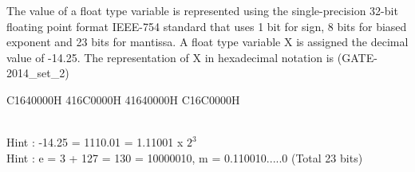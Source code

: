 \begin{questyle}
  \question  The value of a float type variable is represented using the single-precision 32-bit
             floating point format IEEE-754 standard that uses 1 bit for sign, 8 bits for biased
             exponent and 23 bits for mantissa. A float type variable X is assigned the decimal value
             of -14.25. The representation of X in hexadecimal notation is  (GATE-2014\_set\_2)

  \begin{oneparchoices}
    \CorrectChoice  C1640000H
    \choice         416C0000H
    \choice         41640000H
    \choice         C16C0000H
  \end{oneparchoices}
    \\ Hint : -14.25 =  1110.01 = 1.11001 x \(2^{3}\)
    \\ Hint : e = 3 + 127 = 130 = 10000010,  \quad m = 0.110010.....0 (Total 23 bits)
\end{questyle}
